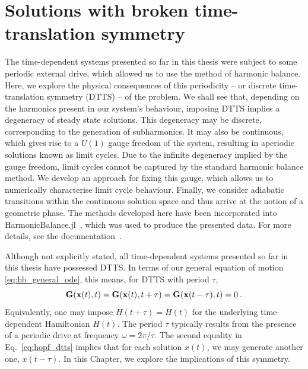 

\chapter{Solutions with broken time-translation symmetry} \label{ch:hopf}


\begin{chapterabstract}
	
	
The time-dependent systems presented so far in this thesis were subject to some periodic external drive, which allowed us to use the method of harmonic balance. Here, we explore the physical consequences of this periodicity -- or discrete time-translation symmetry (DTTS) -- of the problem. We shall see that, depending on the harmonics present in our system's behaviour, imposing DTTS implies a degeneracy of steady state solutions. This degeneracy may be discrete, corresponding to the generation of subharmonics. It may also be continuous, which gives rise to a $U(1)$ gauge freedom of the system, resulting in aperiodic solutions known as limit cycles. Due to the infinite degeneracy implied by the gauge freedom, limit cycles cannot be captured by the standard harmonic balance method. We develop an approach for fixing this gauge, which allows us to numerically characterise limit cycle behaviour. Finally, we consider adiabatic transitions within the continuous solution space and thus arrive at the notion of a geometric phase.
%
\tcblower
%
The methods developed here have been incorporated into HarmonicBalance.jl~\cite{Kosata_2022a}, which was used to produce the presented data. For more details, see the documentation~\cite{harmonic_balance_docs}.
\end{chapterabstract}

Although not explicitly stated, all time-dependent systems presented so far in this thesis have possessed DTTS. In terms of our general equation of motion \eqref{eq:hb_general_ode}, this means, for DTTS with period $\tau$,
\begin{equation} \label{eq:hopf_dtts}
\vb{G}(\vb{x}(t), t)=\vb{G}(\vb{x}(t), t+\tau)=\vb{G}(\vb{x}(t-\tau), t)=0\:.
\end{equation}
Equivalently, one may impose $H(t + \tau) = H(t)$ for the underlying time-dependent Hamiltonian $H(t)$. The period $\tau$ typically results from the presence of a periodic drive at frequency $\omega = 2\pi / \tau$. The second equality in Eq.~\eqref{eq:hopf_dtts} implies that for each solution $x(t)$, we may generate another one, $x(t-\tau)$. In this Chapter, we explore the implications of this symmetry. 

